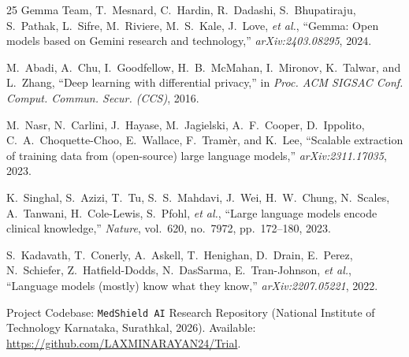 \documentclass[lettersize,journal]{IEEEtran}
\begin{document}
\begin{thebibliography}{25}
Gemma Team, T.~Mesnard, C.~Hardin, R.~Dadashi, S.~Bhupatiraju, S.~Pathak, L.~Sifre, M.~Riviere, M.~S.~Kale, J.~Love, \textit{et al.}, ``Gemma: Open models based on {Gemini} research and technology,'' \textit{arXiv:2403.08295}, 2024.

M.~Abadi, A.~Chu, I.~Goodfellow, H.~B.~McMahan, I.~Mironov, K.~Talwar, and L.~Zhang, ``Deep learning with differential privacy,'' in \textit{Proc. ACM SIGSAC Conf. Comput. Commun. Secur. (CCS)}, 2016.

M.~Nasr, N.~Carlini, J.~Hayase, M.~Jagielski, A.~F.~Cooper, D.~Ippolito, C.~A.~Choquette-Choo, E.~Wallace, F.~Tram\`er, and K.~Lee, ``Scalable extraction of training data from (open-source) large language models,'' \textit{arXiv:2311.17035}, 2023.

K.~Singhal, S.~Azizi, T.~Tu, S.~S.~Mahdavi, J.~Wei, H.~W.~Chung, N.~Scales, A.~Tanwani, H.~Cole-Lewis, S.~Pfohl, \textit{et al.}, ``Large language models encode clinical knowledge,'' \textit{Nature}, vol.~620, no.~7972, pp.~172--180, 2023.

S.~Kadavath, T.~Conerly, A.~Askell, T.~Henighan, D.~Drain, E.~Perez, N.~Schiefer, Z.~Hatfield-Dodds, N.~DasSarma, E.~Tran-Johnson, \textit{et al.}, ``Language models (mostly) know what they know,'' \textit{arXiv:2207.05221}, 2022.

Project Codebase: \texttt{MedShield AI} Research Repository (National Institute of Technology Karnataka, Surathkal, 2026). Available: \url{https://github.com/LAXMINARAYAN24/Trial}.

\end{thebibliography}
\end{document}
